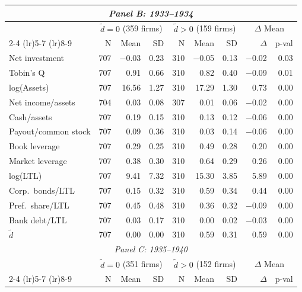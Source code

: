 \begin{table}[p]
\begin{threeparttable}
\begin{tabular}{l rrr rrr rr}
            \midrule
            \multicolumn{9}{c}{\textit{Panel B: 1933--1934}} \\
            \midrule
             & \multicolumn{3}{c}{$\tilde{d} = 0$ (359 firms)} & \multicolumn{3}{c}{$\tilde{d} > 0$ (159 firms)} & \multicolumn{2}{c}{$\Delta$ Mean} \\
            \cmidrule(lr){2-4} \cmidrule(lr){5-7} \cmidrule(lr){8-9}
             & N & Mean & SD & N & Mean & SD & $\Delta$ & p-val \\
            Net investment & 707 & $-$0.03 & 0.23 & 310 & $-$0.05 & 0.13 & $-$0.02 & 0.03 \\
            Tobin's Q & 707 & 0.91 & 0.66 & 310 & 0.82 & 0.40 & $-$0.09 & 0.01 \\
            log(Assets) & 707 & 16.56 & 1.27 & 310 & 17.29 & 1.30 & 0.73 & 0.00 \\
            Net income/assets & 704 & 0.03 & 0.08 & 307 & 0.01 & 0.06 & $-$0.02 & 0.00 \\
            Cash/assets & 707 & 0.19 & 0.15 & 310 & 0.13 & 0.12 & $-$0.06 & 0.00 \\
            Payout/common stock & 707 & 0.09 & 0.36 & 310 & 0.03 & 0.14 & $-$0.06 & 0.00 \\
            Book leverage & 707 & 0.29 & 0.25 & 310 & 0.49 & 0.28 & 0.20 & 0.00 \\
            Market leverage & 707 & 0.38 & 0.30 & 310 & 0.64 & 0.29 & 0.26 & 0.00 \\
            log(LTL) & 707 & 9.41 & 7.32 & 310 & 15.30 & 3.85 & 5.89 & 0.00 \\
            Corp.\ bonds/LTL & 707 & 0.15 & 0.32 & 310 & 0.59 & 0.34 & 0.44 & 0.00 \\
            Pref.\ share/LTL & 707 & 0.45 & 0.48 & 310 & 0.36 & 0.32 & $-$0.09 & 0.00 \\
            Bank debt/LTL & 707 & 0.03 & 0.17 & 310 & 0.00 & 0.02 & $-$0.03 & 0.00 \\
            \ensuremath{\tilde{d}} & 707 & 0.00 & 0.00 & 310 & 0.59 & 0.31 & 0.59 & 0.00 \\
            \midrule
            \multicolumn{9}{c}{\textit{Panel C: 1935--1940}} \\
            \midrule
             & \multicolumn{3}{c}{$\tilde{d} = 0$ (351 firms)} & \multicolumn{3}{c}{$\tilde{d} > 0$ (152 firms)} & \multicolumn{2}{c}{$\Delta$ Mean} \\
            \cmidrule(lr){2-4} \cmidrule(lr){5-7} \cmidrule(lr){8-9}
             & N & Mean & SD & N & Mean & SD & $\Delta$ & p-val \\

\end{tabular}
\end{threeparttable}
\end{table}
